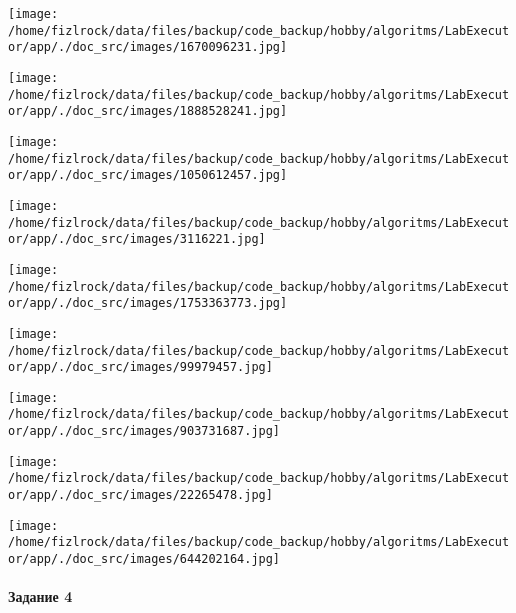 \documentclass[a4paper, 12pt]{article}
\begin{document}
\texttt{[image: /home/fizlrock/data/files/backup/code\_backup/hobby/algoritms/LabExecutor/app/./doc\_src/images/1670096231.jpg]}

\texttt{[image: /home/fizlrock/data/files/backup/code\_backup/hobby/algoritms/LabExecutor/app/./doc\_src/images/1888528241.jpg]}

\texttt{[image: /home/fizlrock/data/files/backup/code\_backup/hobby/algoritms/LabExecutor/app/./doc\_src/images/1050612457.jpg]}

\texttt{[image: /home/fizlrock/data/files/backup/code\_backup/hobby/algoritms/LabExecutor/app/./doc\_src/images/3116221.jpg]}

\texttt{[image: /home/fizlrock/data/files/backup/code\_backup/hobby/algoritms/LabExecutor/app/./doc\_src/images/1753363773.jpg]}

\texttt{[image: /home/fizlrock/data/files/backup/code\_backup/hobby/algoritms/LabExecutor/app/./doc\_src/images/99979457.jpg]}

\texttt{[image: /home/fizlrock/data/files/backup/code\_backup/hobby/algoritms/LabExecutor/app/./doc\_src/images/903731687.jpg]}

\texttt{[image: /home/fizlrock/data/files/backup/code\_backup/hobby/algoritms/LabExecutor/app/./doc\_src/images/22265478.jpg]}

\texttt{[image: /home/fizlrock/data/files/backup/code\_backup/hobby/algoritms/LabExecutor/app/./doc\_src/images/644202164.jpg]}
\pagebreak
\paragraph{Задание 4}
\end{document}
